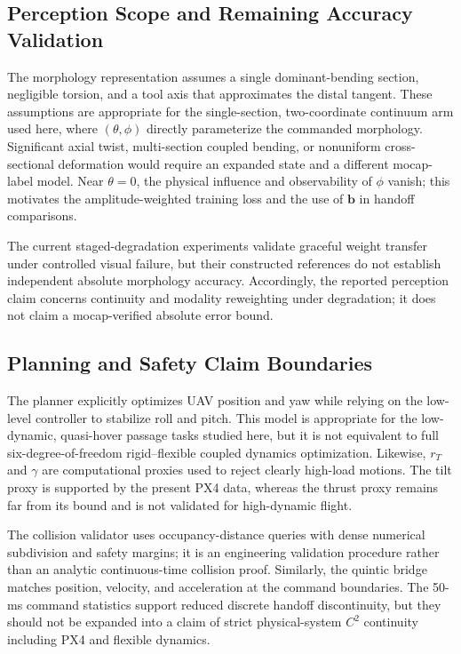 \documentclass[journal,twoside]{IEEEtran}
\begin{document}
\subsection{Perception Scope and Remaining Accuracy Validation}
The morphology representation assumes a single dominant-bending section, negligible torsion, and a tool axis that approximates the distal tangent. These assumptions are appropriate for the single-section, two-coordinate continuum arm used here, where $(\theta,\phi)$ directly parameterize the commanded morphology. Significant axial twist, multi-section coupled bending, or nonuniform cross-sectional deformation would require an expanded state and a different mocap-label model. Near $\theta=0$, the physical influence and observability of $\phi$ vanish; this motivates the amplitude-weighted training loss and the use of $\mathbf b$ in handoff comparisons.

The current staged-degradation experiments validate graceful weight transfer under controlled visual failure, but their constructed references do not establish independent absolute morphology accuracy. Accordingly, the reported perception claim concerns continuity and modality reweighting under degradation; it does not claim a mocap-verified absolute error bound.

\subsection{Planning and Safety Claim Boundaries}
The planner explicitly optimizes UAV position and yaw while relying on the low-level controller to stabilize roll and pitch. This model is appropriate for the low-dynamic, quasi-hover passage tasks studied here, but it is not equivalent to full six-degree-of-freedom rigid--flexible coupled dynamics optimization. Likewise, $r_T$ and $\gamma$ are computational proxies used to reject clearly high-load motions. The tilt proxy is supported by the present PX4 data, whereas the thrust proxy remains far from its bound and is not validated for high-dynamic flight.

The collision validator uses occupancy-distance queries with dense numerical subdivision and safety margins; it is an engineering validation procedure rather than an analytic continuous-time collision proof. Similarly, the quintic bridge matches position, velocity, and acceleration at the command boundaries. The 50-ms command statistics support reduced discrete handoff discontinuity, but they should not be expanded into a claim of strict physical-system $C^2$ continuity including PX4 and flexible dynamics.
\end{document}
